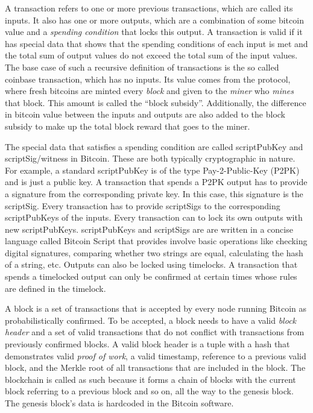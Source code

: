 A  transaction refers to one or more previous transactions, which are called its inputs. It also has one or more outputs, which are a combination of some bitcoin value and a \textit{spending condition} that locks this output. A transaction is valid if it has special data that shows that the spending conditions of each input is met and the total sum of output values do not exceed the total sum of the input values. The base case of such a recursive definition of transactions is the so called coinbase transaction, which has no inputs. Its value comes from the protocol, where fresh bitcoins are minted every \textit{block} and given to the \textit{miner} who \textit{mines} that block. This amount is called the ``block subsidy''. Additionally, the difference in bitcoin value between the inputs and outputs are also added to the block subsidy to make up the total block reward that goes to the miner.

The special data that satisfies a spending condition are called scriptPubKey and scriptSig/witness in Bitcoin. These are both typically cryptographic in nature. For example, a standard scriptPubKey is of the type Pay-2-Public-Key (P2PK) and is just a public key. A transaction that spends a P2PK output has to provide a signature from the corresponding private key. In this case, this signature is the scriptSig. Every transaction has to provide scriptSigs to the corresponding scriptPubKeys of the inputs. Every transaction can to lock its own outputs with new scriptPubKeys. scriptPubKeys and scriptSigs are are written in a concise language called Bitcoin Script that provides involve basic operations like checking digital signatures, comparing whether two strings are equal, calculating the hash of a string, etc. Outputs can also be locked using timelocks. A transaction that spends a timelocked output can only be confirmed at certain times whose rules are defined in the timelock. 

A block is a set of transactions that is accepted by every node running Bitcoin as probabilistically confirmed. To be accepted, a block needs to have a valid \textit{block header} and a set of valid transactions that do not conflict with transactions from previously confirmed blocks. A valid block header is a tuple with a hash that demonstrates valid \textit{proof of work}, a valid timestamp, reference to a previous valid block, and the Merkle root of all transactions that are included in the block. The blockchain is called as such because it forms a chain of blocks with the current block referring to a previous block and so on, all the way to the genesis block. The genesis block's data is hardcoded in the Bitcoin software. 

